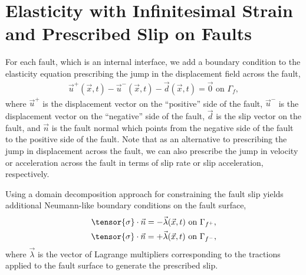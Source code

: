 \section{Elasticity with Infinitesimal Strain and Prescribed Slip on Faults}

For each fault, which is an internal interface, we add a boundary
condition to the elasticity equation prescribing the jump in the
displacement field across the fault,
\begin{gather}
  \label{eqn:bc:prescribed_slip}
  \vec{u}^+(\vec{x},t) - \vec{u}^-(\vec{x},t) - \vec{d}(\vec{x},t) = \vec{0} \text{ on }\Gamma_f,
\end{gather}
where $\vec{u}^+$ is the displacement vector on the ``positive'' side
of the fault, $\vec{u}^-$ is the displacement vector on the
``negative'' side of the fault, $\vec{d}$ is the slip vector on the
fault, and $\vec{n}$ is the fault normal which points from the
negative side of the fault to the positive side of the fault. Note
that as an alternative to prescribing the jump in displacement across
the fault, we can also prescribe the jump in velocity or acceleration
across the fault in terms of slip rate or slip acceleration,
respectively.

Using a domain decomposition approach for constraining the fault slip
yields additional Neumann-like boundary conditions on the fault
surface,
\begin{gather}
  \tensor{\sigma} \cdot \vec{n} = -\vec{\lambda}(\vec{x},t) \text{ on }\Gamma_{f^+}, \\
  \tensor{\sigma} \cdot \vec{n} = +\vec{\lambda}(\vec{x},t) \text{ on }\Gamma_{f^-},
\end{gather}
where $\vec{\lambda}$ is the vector of Lagrange multipliers
corresponding to the tractions applied to the fault surface to
generate the prescribed slip. 

